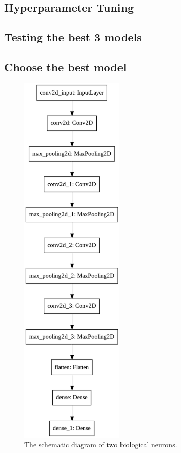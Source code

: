 \documentclass{book}
\begin{document}
            \subsection{Hyperparameter Tuning}
            \subsection{Testing the best 3 models}
            \subsection{Choose the best model}


        


        \begin{figure}[h]
            \centering
            \includegraphics[width=5cm]{smc-best-model.png}
            \caption{The schematic diagram of two biological neurons.}\label{fig:neurons}
        \end{figure}
\end{document}
